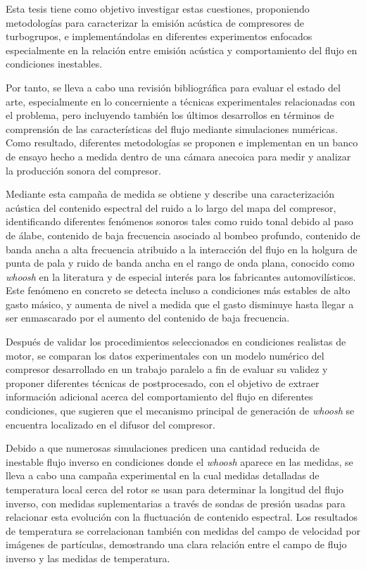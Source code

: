 Esta tesis tiene como objetivo investigar estas cuestiones, proponiendo metodologías para caracterizar la emisión acústica de compresores de turbogrupos, e implementándolas en diferentes experimentos enfocados especialmente en la relación entre emisión acústica y comportamiento del flujo en condiciones inestables.

Por tanto, se lleva a cabo una revisión bibliográfica para evaluar el estado del arte, especialmente en lo concerniente a técnicas experimentales relacionadas con el problema, pero incluyendo también los últimos desarrollos en términos de comprensión de las características del flujo mediante simulaciones numéricas. Como resultado, diferentes metodologías se proponen e implementan en un banco de ensayo hecho a medida dentro de una cámara anecoica para medir y analizar la producción sonora del compresor.

Mediante esta campaña de medida se obtiene y describe una caracterización acústica del contenido espectral del ruido a lo largo del mapa del compresor, identificando diferentes fenómenos sonoros tales como ruido tonal debido al paso de álabe, contenido de baja frecuencia asociado al bombeo profundo, contenido de banda ancha a alta frecuencia atribuido a la interacción del flujo en la holgura de punta de pala y ruido de banda ancha en el rango de onda plana, conocido como \emph{whoosh} en la literatura y de especial interés para los fabricantes automovilísticos. Este fenómeno en concreto se detecta incluso a condiciones más estables de alto gasto másico, y aumenta de nivel a medida que el gasto disminuye hasta llegar a ser enmascarado por el aumento del contenido de baja frecuencia.

Después de validar los procedimientos seleccionados en condiciones realistas de motor, se comparan los datos experimentales con un modelo numérico del compresor desarrollado en un trabajo paralelo a fin de evaluar su validez y proponer diferentes técnicas de postprocesado, con el objetivo de extraer información adicional acerca del comportamiento del flujo en diferentes condiciones, que sugieren que el mecanismo principal de generación de \emph{whoosh} se encuentra localizado en el difusor del compresor.

Debido a que numerosas simulaciones predicen una cantidad reducida de inestable flujo inverso en condiciones donde el \emph{whoosh} aparece en las  medidas, se lleva a cabo una campaña experimental en la cual medidas detalladas de temperatura local cerca del rotor se usan para determinar la longitud del flujo inverso, con medidas suplementarias a través de sondas de presión usadas para relacionar esta evolución con la fluctuación de contenido espectral. Los resultados de temperatura se correlacionan también con medidas del campo de velocidad por imágenes de partículas, demostrando una clara relación entre el campo de flujo inverso y las medidas de temperatura.

